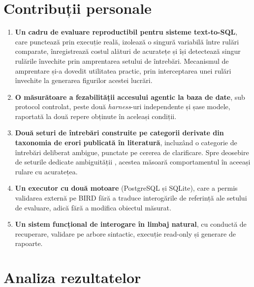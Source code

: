 \documentclass[12pt,a4paper]{report}
\begin{document}
\section{Contribuții personale}

\begin{enumerate}[nosep,leftmargin=*]
  \item \textbf{Un cadru de evaluare reproductibil pentru sisteme text-to-SQL},
    care punctează prin execuție reală, izolează o singură variabilă între
    rulări comparate, înregistrează costul alături de acuratețe și își
    detectează singur rulările învechite prin amprentarea setului de
    întrebări. Mecanismul de amprentare și-a dovedit utilitatea practic, prin
    interceptarea unei rulări învechite la generarea figurilor acestei
    lucrări.
  \item \textbf{O măsurătoare a fezabilității accesului agentic la baza de
    date}, sub protocol controlat, peste două \emph{harness}-uri
    independente și șase modele, raportată la două repere obținute în
    aceleași condiții.
  \item \textbf{Două seturi de întrebări construite pe categorii derivate din
    taxonomia de erori publicată în literatură}, incluzând o categorie de
    întrebări deliberat ambigue, punctate pe cererea de clarificare. Spre
    deosebire de seturile dedicate ambiguității \cite{ambiqt, practiq},
    acestea măsoară comportamentul în aceeași rulare cu acuratețea.
  \item \textbf{Un executor cu două motoare} (PostgreSQL și SQLite), care a
    permis validarea externă pe BIRD fără a traduce interogările de referință
    ale setului de evaluare, adică fără a modifica obiectul măsurat.
  \item \textbf{Un sistem funcțional de interogare în limbaj natural}, cu
    conductă de recuperare, validare pe arbore sintactic, execuție
    read-only și generare de rapoarte.
\end{enumerate}

\section{Analiza rezultatelor}
\end{document}
